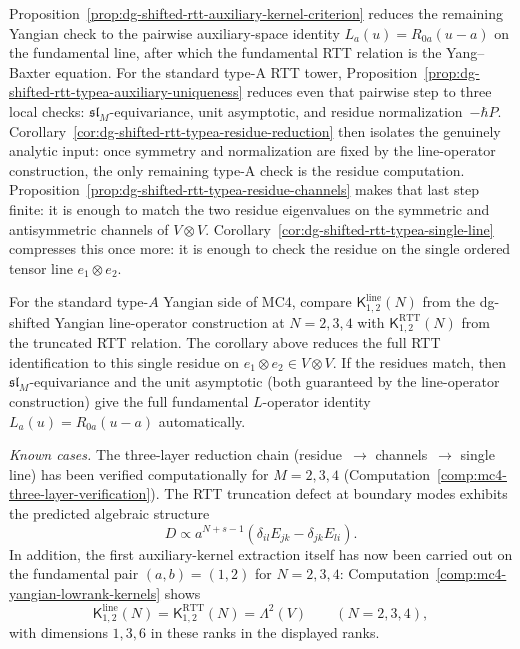 \begin{remark}
Proposition~\ref{prop:dg-shifted-rtt-auxiliary-kernel-criterion}
reduces the remaining Yangian check to the pairwise auxiliary-space
identity $L_a(u)=R_{0a}(u-a)$ on the fundamental line, after which the
fundamental RTT relation is the Yang--Baxter equation.  For the
standard type-A RTT tower,
Proposition~\ref{prop:dg-shifted-rtt-typea-auxiliary-uniqueness}
reduces even that pairwise step to three local checks:
$\mathfrak{sl}_M$-equivariance, unit asymptotic, and residue
normalization~$-\hbar P$.  Corollary~\ref{cor:dg-shifted-rtt-typea-residue-reduction}
then isolates the genuinely analytic input: once symmetry and
normalization are fixed by the line-operator construction, the only
remaining type-A check is the residue computation.
Proposition~\ref{prop:dg-shifted-rtt-typea-residue-channels} makes that
last step finite: it is enough to match the two
residue eigenvalues on the symmetric and antisymmetric channels of
$V\otimes V$.  Corollary~\ref{cor:dg-shifted-rtt-typea-single-line}
compresses this once more: it is enough to check the residue on the
single ordered tensor line $e_1\otimes e_2$.

\begin{remark}
\label{rem:mc4-yangian-computation-target}
For the standard type-$A$ Yangian side of MC4, compare
$\mathsf{K}^{\mathrm{line}}_{1,2}(N)$ from the dg-shifted Yangian
line-operator construction at $N = 2, 3, 4$ with
$\mathsf{K}^{\mathrm{RTT}}_{1,2}(N)$ from the truncated RTT
relation.  The corollary above reduces the full RTT identification to
this single residue on $e_1 \otimes e_2 \in V \otimes V$.  If the
residues match, then $\mathfrak{sl}_M$-equivariance and the unit
asymptotic (both guaranteed by the line-operator construction) give
the full fundamental $L$-operator identity
$L_a(u) = R_{0a}(u-a)$ automatically.

\emph{Known cases.}
The three-layer reduction chain
(residue~$\to$ channels~$\to$ single line) has been verified
computationally for $M = 2, 3, 4$
(Computation~\ref{comp:mc4-three-layer-verification}).  The RTT truncation defect at boundary modes exhibits
the predicted algebraic structure
\[
D \propto a^{N+s-1}(\delta_{il}E_{jk} - \delta_{jk}E_{li}).
\]
In addition, the first auxiliary-kernel extraction itself has now been
carried out on the fundamental pair $(a,b)=(1,2)$ for $N=2,3,4$:
Computation~\ref{comp:mc4-yangian-lowrank-kernels} shows
\[
\mathsf{K}^{\mathrm{line}}_{1,2}(N)
=
\mathsf{K}^{\mathrm{RTT}}_{1,2}(N)
=
\Lambda^2(V)
\qquad
(N=2,3,4),
\]
with dimensions $1,3,6$ in these ranks
in the displayed ranks.


\end{remark}
\end{remark}
